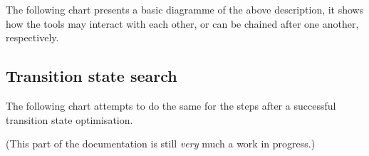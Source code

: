 \documentclass[   %
  final,          %
  a4paper         %
]{article}
\begin{document}
The following chart presents a basic diagramme of the above description,
it shows how the tools may interact with each other,
or can be chained after one another, respectively.


\subsection{Transition state search}

The following chart attempts to do the same for the steps after a successful 
transition state optimisation.

(This part of the documentation is still \emph{very} much a work in progress.)

\end{document}
